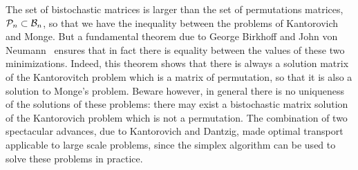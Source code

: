 The set of bistochastic matrices is larger than the set of permutations matrices, $\mathcal{P}_n \subset \mathcal{B}_n$, so that we have the inequality
between the problems of Kantorovich and Monge. But a fundamental theorem due to George Birkhoff and John von Neumann~\cite{birkhoff,von1953certain} ensures that in fact there is equality between the values of these two minimizations. Indeed, this theorem shows that there is always a solution matrix of the Kantorovitch problem which is a matrix of permutation, so that it is also a solution to Monge's problem. Beware however, in general there is no uniqueness of the solutions of these problems: there may exist a bistochastic matrix solution of the Kantorovich problem which is not a permutation.
%
The combination of two spectacular advances, due to Kantorovich and Dantzig, made optimal transport applicable to large scale problems, since the simplex algorithm can be used to solve these problems in practice.


